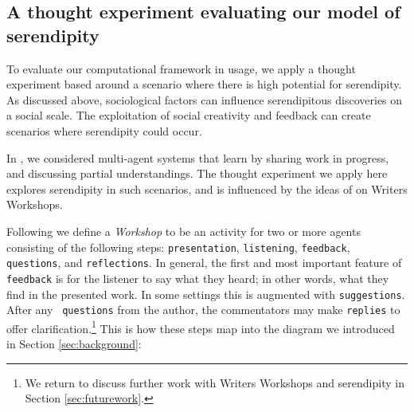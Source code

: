\subsection{A thought experiment evaluating our model of serendipity} \label{sec:ww}

To evaluate our computational framework in usage, we apply a thought
experiment based around a scenario where there is high potential for
serendipity.  As discussed above, sociological factors can influence
serendipitous discoveries on a social scale.  The exploitation of
social creativity and feedback can create scenarios where serendipity
could occur.

In \cite{poetry-workshop}, we considered multi-agent systems that
learn by sharing work in progress, and discussing partial
understandings.  The thought experiment we apply here explores
serendipity in such scenarios, and is influenced by the ideas of
 on Writers Workshops.

Following 
we define a \emph{Workshop} to be an activity for two or more agents
consisting of the following steps:
{\tt presentation}, {\tt listening}, {\tt feedback}, {\tt questions},
and {\tt reflections}.  In general, the first and most important
feature of {\tt feedback} is for the listener to say what they heard;
in other words, what they find in the presented work.  In some
settings this is augmented with {\tt suggestions}.  After any {\tt
  questions} from the author, the commentators may make {\tt replies}
to offer clarification.\footnote{We return to discuss further work with Writers Workshops and serendipity in Section \ref{sec:futurework}.}
This is how these steps map into the diagram we introduced in Section \ref{sec:background}:


